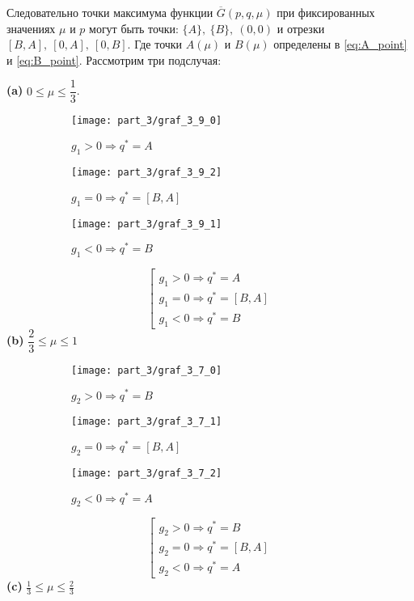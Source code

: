 Следовательно точки максимума функции $\overline{G}(p,q,\mu)$ при 
фиксированных значениях $\mu$ и $p$ могут быть точки: 
$\{A\}, \: \{B\}, \: (0,0)$ и отрезки $[B, A], \: [0, A], \: [0,B]$. Где точки
$A(\mu)$ и $B(\mu)$ определены в \eqref{eq:A_point} и \eqref{eq:B_point}. 
Рассмотрим три подслучая:

\newpage
\textbf{(a)} 
$0 \leqslant \mu \leqslant \dfrac{1}{3}$. 	
\begin{figure}[H]
   	\centering
   	\begin{subfigure}[b]{0.3 \textwidth}
       	\centering
       	\texttt{[image: part\_3/graf\_3\_9\_0]}
       	\caption{$g_1 > 0 \Rightarrow q^*=A$}
       	\label{fig:y equals x}
   	\end{subfigure}
   	\begin{subfigure}[b]{0.3 \textwidth}
     	\centering
       	\texttt{[image: part\_3/graf\_3\_9\_2]}
       	\caption{$g_1 = 0 \Rightarrow q^*=[B,A]$}
       	\label{fig:three sin x}
   	\end{subfigure}
   	\begin{subfigure}[b]{0.3 \textwidth}
      	\centering
       	\texttt{[image: part\_3/graf\_3\_9\_1]}
       	\caption{$g_1 < 0 \Rightarrow q^*=B$}
       	\label{fig:three sin x}
   	\end{subfigure}
   	\caption{}
   	\label{fig:3_mu_0}
\end{figure}
$$
	\left[
	\begin{gathered}
		g_1 > 0 \Rightarrow q^*=A \\
		g_1 = 0 \Rightarrow q^*=[B,A] \\
		g_1 < 0 \Rightarrow q^*=B
	\end{gathered}
	\right.
$$
\textbf{(b)}
$\dfrac{2}{3} \leqslant \mu \leqslant 1$	
\begin{figure}[H]
   	\centering
   	\begin{subfigure}[b]{0.3 \textwidth}
      	\centering
       	\texttt{[image: part\_3/graf\_3\_7\_0]}
       	\caption{$g_2 > 0 \Rightarrow q^*=B$}
       	\label{fig:y equals x}
   	\end{subfigure}
   	\begin{subfigure}[b]{0.3 \textwidth}
       	\centering
       	\texttt{[image: part\_3/graf\_3\_7\_1]}
       	\caption{$g_2 = 0 \Rightarrow q^*=[B,A]$}
       	\label{fig:three sin x}
   	\end{subfigure}
   	\begin{subfigure}[b]{0.3 \textwidth}
      	\centering
       	\texttt{[image: part\_3/graf\_3\_7\_2]}
       	\caption{$g_2 < 0 \Rightarrow q^*=A$}
       	\label{fig:three sin x}
   	\end{subfigure}
   	\caption{}
\end{figure}	
$$
	\left[
	\begin{gathered}
		g_2 > 0 \Rightarrow q^*=B \\
		g_2 = 0 \Rightarrow q^*=[B,A] \\
		g_2 < 0 \Rightarrow q^*=A
	\end{gathered}
	\right.
$$
\textbf{(c)} 
$\frac{1}{3} \leqslant \mu \leqslant \frac{2}{3}$
	
